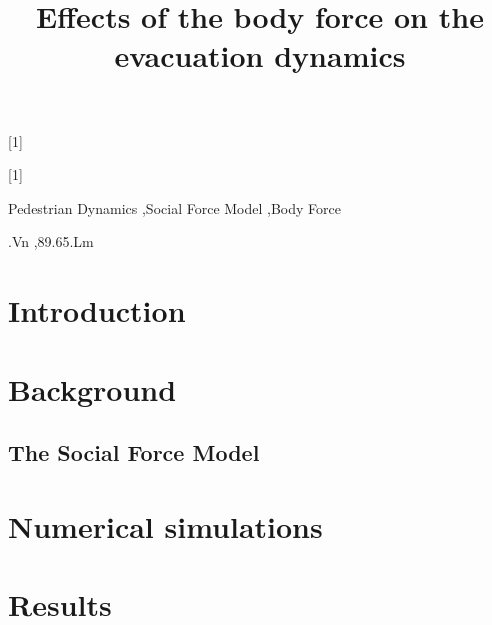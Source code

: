 \documentclass[preprint,12pt]{elsarticle}
\begin{document}
\newcommand*{\hwplotB}{\raisebox{3pt}{\tikz{\draw[red,dashed,line 
width=3.2pt](0,0) -- 
(5mm,0);}}}

\newrobustcmd*{\mydiamond}[1]{}

\newrobustcmd*{\mytriangleleft}[1]{}

\begin{frontmatter}


\title{Effects of the body force on the evacuation dynamics}


\begin{abstract}

\end{abstract}

\begin{keyword}

Pedestrian Dynamics \sep Social Force Model \sep Body Force


.Vn \sep 89.65.Lm

\end{keyword}

\end{frontmatter}


\section{\label{introduction}Introduction}

\section{\label{background}Background}

\subsection{\label{sfm}The Social Force Model}


\section{\label{simulations}Numerical simulations}


\section{\label{results}Results}
\end{document}
